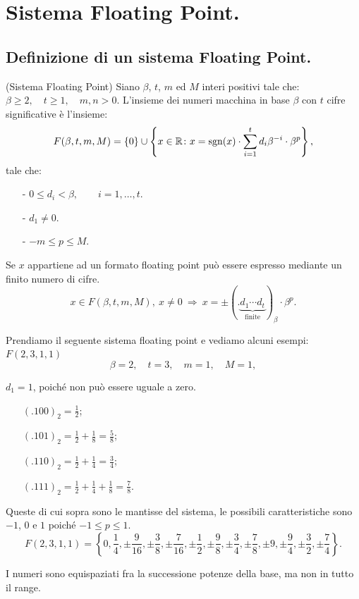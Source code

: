 

\chapter{Sistema Floating Point.}

\section{Definizione di un sistema Floating Point.}
\begin{defi}(Sistema Floating Point)
Siano $\beta$, $t$, $m$ ed $M$ interi positivi tale che:
$\beta \geq 2, \quad t \geq 1, \quad m,n > 0.$ L'insieme dei numeri macchina
in base $\beta$ con $t$ cifre significative è l'insieme:
\[F(\beta, t, m, M) = \{0\} \cup \left\{x \in \mathbb{R} \colon x = \textrm{sgn}(x)
\cdot \sum_{i = 1}^{t}d_i\beta^{-i}\cdot \beta^p\right\},\]
tale che:
\begin{itemize}
\item[-]$0 \leq d_i < \beta, \qquad i = 1, \ldots, t.$
\item[-]$d_1 \neq 0.$
\item[-]$-m \leq p \leq M$.
\end{itemize}
\end{defi}

\begin{osse}Se $x$ appartiene ad un formato floating point può essere
espresso mediante un finito numero di cifre.
\[x \in F(\beta, t, m, M), \ x \neq 0 \ \Rightarrow \ x = \pm (.
\underbrace{d_1\cdots d_t}_{\textrm{finite}}
)_{\beta}\cdot \beta^p.\]
\end{osse}

\begin{exe}
Prendiamo il seguente sistema floating point e vediamo alcuni esempi:\\

$F(2,3,1,1)$
\[\beta = 2, \quad t = 3, \quad m = 1, \quad M = 1,\]

$d_1 = 1$, poiché non può essere uguale a zero.
\begin{itemize}
\item[]$(.100)_2 = \frac{1}{2}$;
\item[]$(.101)_2 = \frac{1}{2} + \frac{1}{8} = \frac{5}{8}$;
\item[]$(.110)_2 = \frac{1}{2} + \frac{1}{4} = \frac{3}{4}$;
\item[]$(.111)_2 = \frac{1}{2} + \frac{1}{4} + \frac{1}{8} = \frac{7}{8}$.
\end{itemize}
Queste di cui sopra sono le mantisse del sistema, le possibili
caratteristiche sono $-1$, $0$ e $1$ poiché $-1 \leq p \leq 1$.
\[F(2,3,1,1) = \left\{0, \frac{1}{4}, \pm\frac{9}{16}, \pm\frac{3}{8}, 
\pm\frac{7}{16}, \pm\frac{1}{2}, \pm\frac{9}{8}, \pm\frac{3}{4}, 
\pm\frac{7}{8}, \pm 9, \pm\frac{9}{4}, \pm\frac{3}{2}, \pm\frac{7}{4}
\right\}.
\]
\end{exe}
I numeri sono equispaziati fra la successione potenze della base, ma non in 
tutto il range.

